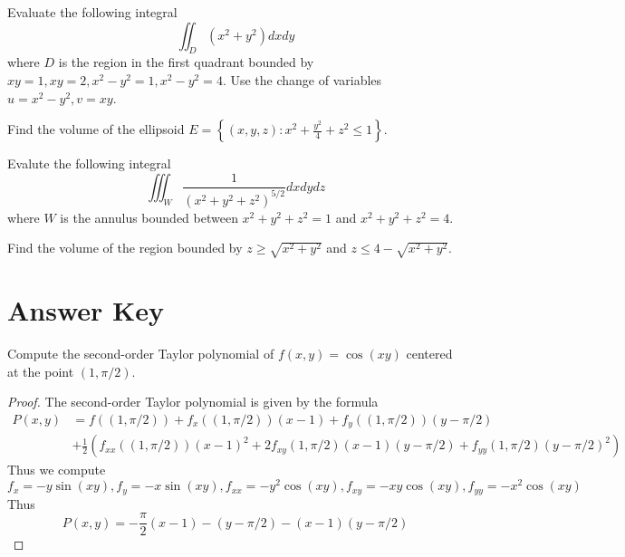\documentclass[openany]{book}
\begin{document}
\begin{prob}
    Evaluate the following integral 
    \begin{equation*}
        \iint_D(x^2+y^2)dxdy
    \end{equation*}
    where $D$ is the region in the first quadrant bounded by $xy=1, xy=2, x^2-y^2=1, x^2-y^2=4$. Use the change of variables $u=x^2-y^2, v=xy$.
\end{prob}


\begin{prob}
    Find the volume of the ellipsoid $E=\left\{(x,y,z): x^2+\frac{y^2}{4}+z^2\leq 1\right\}$.
\end{prob}


\begin{prob}
    Evalute the following integral 
    \begin{equation*}
        \iiint_W\frac{1}{(x^2+y^2+z^2)^{5/2}}dxdydz
    \end{equation*}
    where $W$ is the annulus bounded between $x^2+y^2+z^2=1$ and $x^2+y^2+z^2=4$.
\end{prob}

\begin{prob}
    Find the volume of the region bounded by $z\geq\sqrt{x^2+y^2}$ and $z\leq 4-\sqrt{x^2+y^2}$.
\end{prob}





\chapter{Answer Key}

\begin{prob}
    Compute the second-order Taylor polynomial of $f(x,y)=\cos(xy)$ centered at the point $(1,\pi/2)$. 
\end{prob}
\begin{proof}
    The second-order Taylor polynomial is given by the formula 
    \begin{align*}
        P(x,y)&=f((1,\pi/2))+f_x((1,\pi/2))(x-1)+f_y((1,\pi/2))(y-\pi/2)\\
        &+\frac{1}{2}\left(f_{xx}((1,\pi/2))(x-1)^2+2f_{xy}(1,\pi/2)(x-1)(y-\pi/2)+f_{yy}(1,\pi/2)(y-\pi/2)^2\right)
    \end{align*}
    Thus we compute 
    \begin{equation*}
        f_x=-y\sin(xy), f_y=-x\sin(xy), f_{xx}=-y^2\cos(xy), f_{xy}=-xy\cos(xy), f_{yy}=-x^2\cos(xy)
    \end{equation*}
    Thus 
    \begin{equation*}
        P(x,y)=-\frac{\pi}{2}(x-1)-(y-\pi/2)-(x-1)(y-\pi/2)
    \end{equation*}
\end{proof}
\end{document}
